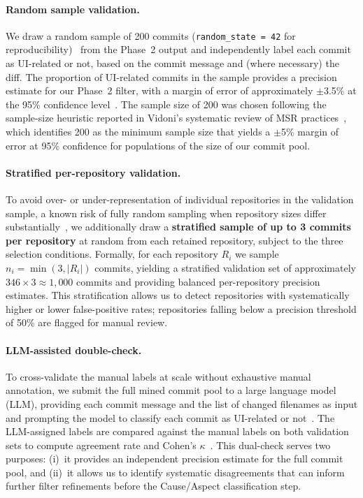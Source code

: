 \documentclass{article}
\begin{document}
\paragraph{Random sample validation.}
We draw a random sample of 200 commits (\texttt{random\_state = 42}
for reproducibility)~\cite{vidoni2022systematic} from the Phase~2 output
and independently label each commit as UI-related or not, based on the
commit message and (where necessary) the diff. The proportion of
UI-related commits in the sample provides a precision estimate for our
Phase~2 filter, with a margin of error of approximately $\pm$3.5\% at
the 95\% confidence level~\cite{vidoni2022systematic}. The sample size of
200 was chosen following the sample-size heuristic reported in Vidoni's
systematic review of MSR practices~\cite{vidoni2022systematic}, which
identifies 200 as the minimum sample size that yields a $\pm$5\% margin
of error at 95\% confidence for populations of the size of our commit
pool.

\paragraph{Stratified per-repository validation.}
To avoid over- or under-representation of individual repositories in
the validation sample, a known risk of fully random sampling when
repository sizes differ substantially~\cite{vidoni2022systematic},
we additionally draw a \textbf{stratified sample of up to 3 commits per
repository} at random from each retained repository, subject to the
three selection conditions. Formally, for each repository $R_i$ we sample
$n_i = \min(3, |R_i|)$ commits, yielding a stratified validation set
of approximately $346 \times 3 \approx 1{,}000$ commits and providing
balanced per-repository precision estimates. This stratification allows
us to detect repositories with systematically higher or lower
false-positive rates; repositories falling below a precision threshold
of 50\% are flagged for manual review.

\paragraph{LLM-assisted double-check.}
To cross-validate the manual labels at scale without exhaustive manual
annotation, we submit the full mined commit pool to a large language
model (LLM), providing each commit message and the list of changed
filenames as input and prompting the model to classify each commit as
UI-related or not~\cite{hou2024}. The LLM-assigned labels are compared
against the manual labels on both validation sets to compute agreement
rate and Cohen's $\kappa$~\cite{cohen1960, vidoni2022systematic}. This
dual-check serves two purposes: (i)~it provides an independent precision
estimate for the full commit pool, and (ii)~it allows us to identify
systematic disagreements that can inform further filter refinements before
the Cause/Aspect classification step.
\end{document}
